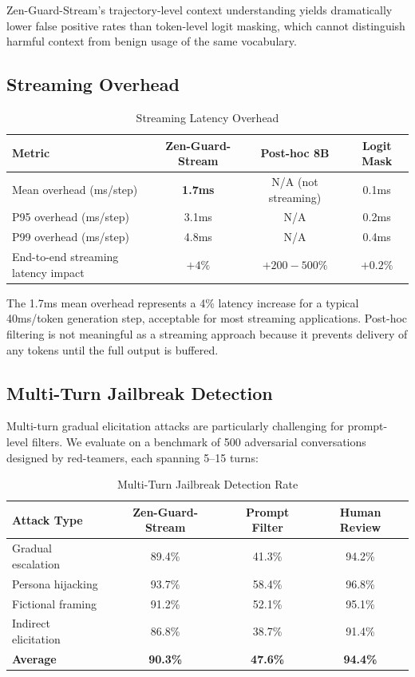 \documentclass[11pt,a4paper]{article}
\begin{document}
Zen-Guard-Stream's trajectory-level context understanding yields dramatically lower false positive rates than token-level logit masking, which cannot distinguish harmful context from benign usage of the same vocabulary.

\subsection{Streaming Overhead}

\begin{table}[H]
\centering
\caption{Streaming Latency Overhead}
\begin{tabular}{lccc}
\toprule
\textbf{Metric} & \textbf{Zen-Guard-Stream} & \textbf{Post-hoc 8B} & \textbf{Logit Mask} \\
\midrule
Mean overhead (ms/step) & \textbf{1.7ms} & N/A (not streaming) & 0.1ms \\
P95 overhead (ms/step) & 3.1ms & N/A & 0.2ms \\
P99 overhead (ms/step) & 4.8ms & N/A & 0.4ms \\
End-to-end streaming latency impact & $+4\%$ & $+200-500\%$ & $+0.2\%$ \\
\bottomrule
\end{tabular}
\end{table}

The 1.7ms mean overhead represents a 4\% latency increase for a typical 40ms/token generation step, acceptable for most streaming applications. Post-hoc filtering is not meaningful as a streaming approach because it prevents delivery of any tokens until the full output is buffered.

\subsection{Multi-Turn Jailbreak Detection}

Multi-turn gradual elicitation attacks are particularly challenging for prompt-level filters. We evaluate on a benchmark of 500 adversarial conversations designed by red-teamers, each spanning 5--15 turns:

\begin{table}[H]
\centering
\caption{Multi-Turn Jailbreak Detection Rate}
\begin{tabular}{lccc}
\toprule
\textbf{Attack Type} & \textbf{Zen-Guard-Stream} & \textbf{Prompt Filter} & \textbf{Human Review} \\
\midrule
Gradual escalation & 89.4\% & 41.3\% & 94.2\% \\
Persona hijacking & 93.7\% & 58.4\% & 96.8\% \\
Fictional framing & 91.2\% & 52.1\% & 95.1\% \\
Indirect elicitation & 86.8\% & 38.7\% & 91.4\% \\
\textbf{Average} & \textbf{90.3\%} & \textbf{47.6\%} & \textbf{94.4\%} \\
\bottomrule
\end{tabular}
\end{table}
\end{document}
